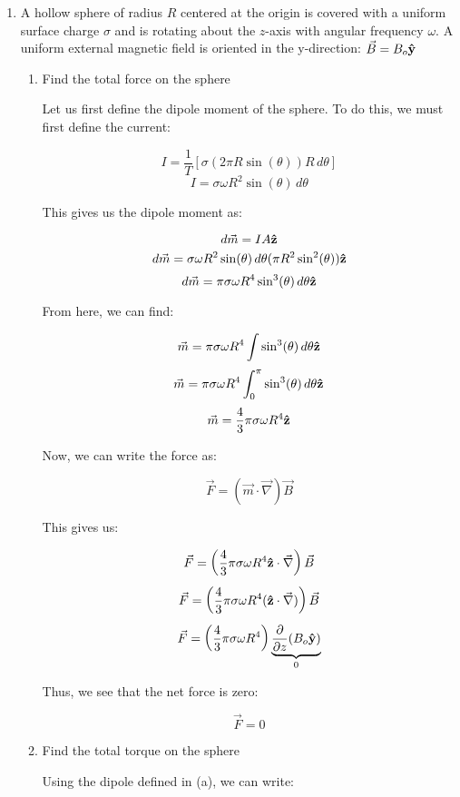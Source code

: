 \begin{enumerate}

  \item A hollow sphere of radius $R$ centered at the origin is covered with a uniform surface charge $\sigma$ and is rotating about the $z$-axis with angular frequency $\omega$.  A uniform external magnetic field is oriented in the y-direction: $\vec{B}=B_o\bold{\hat{y}}$

    \begin{enumerate}

      \item Find the total force on the sphere

        Let us first define the dipole moment of the sphere. To do this, we must first define the current:

        $$I=\frac{1}{T}\left[ \sigma(2\pi R\sin(\theta)) R\,d\theta \right]$$
        $$I=\sigma\omega R^2\sin(\theta)\,d\theta$$

        This gives us the dipole moment as:

        $$d\vec{m}=IA\bold{\hat{z}}$$
        $$d\vec{m}=\sigma\omega R^2\sin(\theta)\,d\theta( \pi R^2\sin^2(\theta))\bold{\hat{z}}$$
        $$d\vec{m}=\pi\sigma\omega R^4\sin^3(\theta)\,d\theta\bold{\hat{z}}$$

        From here, we can find:

        $$\vec{m}=\pi\sigma\omega R^4\int\sin^3(\theta)\,d\theta\bold{\hat{z}}$$
        $$\vec{m}=\pi\sigma\omega R^4\int_0^\pi\sin^3(\theta)\,d\theta\bold{\hat{z}}$$
        $$\vec{m}=\frac{4}{3}\pi\sigma\omega R^4\bold{\hat{z}}$$

        Now, we can write the force as:

        $$\vec{F}=(\vec{m}\cdot\vec{\nabla})\vec{B}$$

        This gives us:

        $$\vec{F}=\left( \frac{4}{3}\pi\sigma\omega R^4\bold{\hat{z}}\cdot\vec{\nabla} \right)\vec{B}$$
        $$\vec{F}=\left( \frac{4}{3}\pi\sigma\omega R^4(\bold{\hat{z}}\cdot\vec{\nabla}) \right)\vec{B}$$
        $$\vec{F}=\left( \frac{4}{3}\pi\sigma\omega R^4 \right)\underbrace{\frac{\partial}{\partial z}(B_o\bold{\hat{y}})}_0$$

        Thus, we see that the net force is zero:

        $$\boxed{\vec{F}=0}$$

      \item Find the total torque on the sphere

        Using the dipole defined in (a), we can write:


\end{enumerate}
\end{enumerate}
